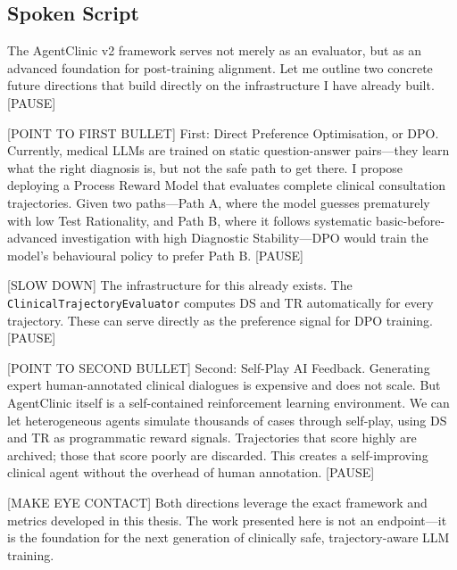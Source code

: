 \subsection*{Spoken Script}
\begin{spokenbox}
 The AgentClinic v2 framework serves not merely as an evaluator, but as an advanced foundation for post-training alignment. Let me outline two concrete future directions that build directly on the infrastructure I have already built. [PAUSE]

[POINT TO FIRST BULLET] First: Direct Preference Optimisation, or DPO. Currently, medical LLMs are trained on static question-answer pairs---they learn what the right diagnosis is, but not the safe path to get there. I propose deploying a Process Reward Model that evaluates complete clinical consultation trajectories. Given two paths---Path A, where the model guesses prematurely with low Test Rationality, and Path B, where it follows systematic basic-before-advanced investigation with high Diagnostic Stability---DPO would train the model's behavioural policy to prefer Path B. [PAUSE]

[SLOW DOWN] The infrastructure for this already exists. The \texttt{ClinicalTrajectoryEvaluator} computes DS and TR automatically for every trajectory. These can serve directly as the preference signal for DPO training. [PAUSE]

[POINT TO SECOND BULLET] Second: Self-Play AI Feedback. Generating expert human-annotated clinical dialogues is expensive and does not scale. But AgentClinic itself is a self-contained reinforcement learning environment. We can let heterogeneous agents simulate thousands of cases through self-play, using DS and TR as programmatic reward signals. Trajectories that score highly are archived; those that score poorly are discarded. This creates a self-improving clinical agent without the overhead of human annotation. [PAUSE]

[MAKE EYE CONTACT] Both directions leverage the exact framework and metrics developed in this thesis. The work presented here is not an endpoint---it is the foundation for the next generation of clinically safe, trajectory-aware LLM training.
\end{spokenbox}

